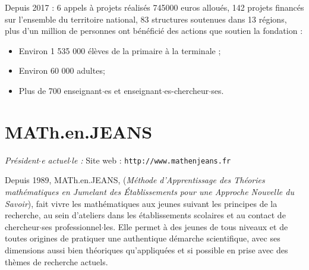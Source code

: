Depuis 2017 : 6 appels \`a projets r\'ealis\'es 745000 euros allou\'es, 142 projets financ\'es sur l’ensemble du territoire national, 83 structures soutenues dans 13 r\'egions, plus d’un million de personnes ont b\'en\'efici\'e des actions que soutien la fondation :
\begin{itemize}
\item Environ 1 535 000 \'el\`eves de la primaire \`a la terminale ;
\item Environ 60 000 adultes;
\item Plus de 700 enseignant$\cdot$es et enseignant$\cdot$es-chercheur$\cdot$ses.
\end{itemize}


%
%
%
%


\section{MATh.en.JEANS}

\emph{Pr\'esident$\cdot$e actuel$\cdot$le : }\hfill Site web : {\tt http://www.mathenjeans.fr}
\smallskip

Depuis 1989, MATh.en.JEANS, ({\em M\'ethode d'Apprentissage des Th\'eories math\'ematiques en Jumelant des \'Etablissements pour une Approche Nouvelle du Savoir}), fait vivre les math\'ematiques aux jeunes suivant les principes de la recherche, au sein d'ateliers dans les \'etablissements scolaires et au contact de chercheur$\cdot$ses professionnel$\cdot$les. Elle permet \`a des jeunes  de tous niveaux et de toutes origines de pratiquer une authentique d\'emarche scientifique, avec ses dimensions aussi bien th\'eoriques qu'appliqu\'ees et si possible en prise avec des th\`emes de recherche actuels.

